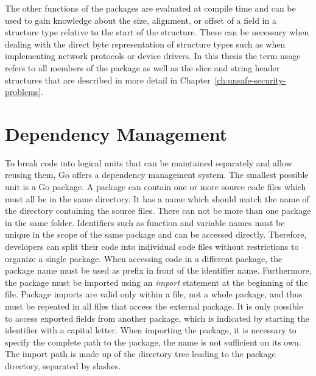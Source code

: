 

The other functions of the \unsafe{} packages are evaluated at compile time and can be used to gain knowledge about
the size, alignment, or offset of a field in a structure type relative to the start of the structure.
These can be necessary when dealing with the direct byte representation of structure types such as when implementing
network protocols or device drivers.
In this thesis the term \unsafe{} usage refers to all members of the \unsafe{} package as well as the slice and string
header structures that are described in more detail in Chapter~\ref{ch:unsafe-security-problems}.



\section{Dependency Management}\label{sec:background:dependencies}

To break code into logical units that can be maintained separately and allow reusing them, Go offers a dependency
management system.
The smallest possible unit is a Go package.
A package can contain one or more source code files which must all be in the same directory.
It has a name which should match the name of the directory containing the source files.
There can not be more than one package in the same folder.
Identifiers such as function and variable names must be unique in the scope of the same package and can be accessed
directly.
Therefore, developers can split their code into individual code files without restrictions to organize a single package.
When accessing code in a different package, the package name must be used as prefix in front of the identifier name.
Furthermore, the package must be imported using an \textit{import} statement at the beginning of the file.
Package imports are valid only within a file, not a whole package, and thus must be repeated in all files that access
the external package.
It is only possible to access exported fields from another package, which is indicated by starting the identifier with
a capital letter.
When importing the package, it is necessary to specify the complete path to the package, the name is not sufficient on
its own.
The import path is made up of the directory tree leading to the package directory, separated by slashes.


